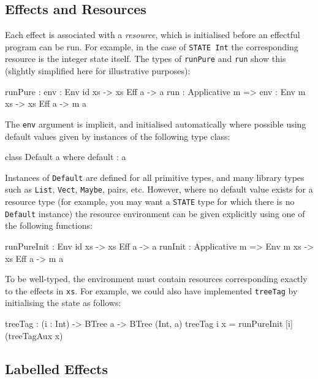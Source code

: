 \subsection{Effects and Resources}

Each effect is associated with a \emph{resource}, which is initialised before
an effectful program can be run. For example, in the case of \texttt{STATE Int}
the corresponding resource is the integer state itself.
The types of \texttt{runPure} and \texttt{run} show this (slightly
simplified here for illustrative purposes):

\begin{code}
runPure : {env : Env id xs} -> { xs } Eff a -> a
run : Applicative m => {env : Env m xs} -> { xs } Eff a -> m a
\end{code}

\noindent
The \texttt{env} argument is implicit, and initialised automatically where
possible using default values given by instances of the following type class:

\begin{code}
class Default a where
    default : a
\end{code}

\noindent
Instances of \texttt{Default} are defined for all primitive types, and many
library types such as \texttt{List}, \texttt{Vect}, \texttt{Maybe}, pairs,
etc. However, where no default value exists for a resource type (for example,
you may want a \texttt{STATE} type for which there is no \texttt{Default}
instance) the resource environment can be given explicitly using one of
the following functions:

\begin{code}
runPureInit : Env id xs -> { xs } Eff a -> a
runInit : Applicative m => Env m xs -> { xs } Eff a -> m a
\end{code}

\noindent
To be well-typed, the environment must contain resources corresponding exactly
to the effects in \texttt{xs}.
For example, we could also have implemented \texttt{treeTag} by initialising
the state as follows:

\begin{code}
treeTag : (i : Int) -> BTree a -> BTree (Int, a)
treeTag i x = runPureInit [i] (treeTagAux x)
\end{code}

\subsection{Labelled Effects}


